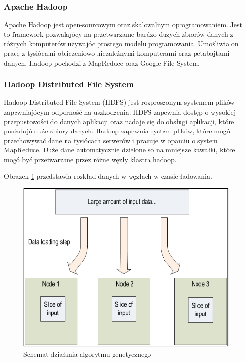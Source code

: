 \subsubsection{Apache Hadoop}
\label{ssub:apache_hadoop}
Apache Hadoop jest open-sourcowym oraz skalowalnym oprogramowaniem. Jest to framework pozwalajócy na przetwarzanie bardzo dużych zbiorów danych z różnych komputerów używajóc prostego modelu programowania. Umożliwia on pracę z tysiócami obliczeniowo niezależnymi komputerami oraz petabajtami danych. Hadoop pochodzi z MapReduce oraz Google File System.

\subsubsection{Hadoop Distributed File System}
\label{ssub:hdfs}
Hadoop Distributed File System (HDFS) jest rozproszonym systemem plików zapewniajócym odporność na uszkodzenia. HDFS zapewnia dostęp o wysokiej przepustowości do danych aplikacji oraz nadaje się do obsługi aplikacji, które posiadajó duże zbiory danych. Hadoop zapewnia system plików, które mogó przechowywać dane na tysiócach serwerów i pracuje w oparciu o system MapReduce. Duże dane automatycznie dzielone só na mniejsze kawałki, które mogó być przetwarzane przez różne węzły klastra hadoop.

Obrazek \ref{fig:rozklad_danych} przedstawia rozkład danych w węzłach w czasie ładowania.

\begin{figure}[h]
    \centerline{\includegraphics[scale=0.5]{obrazki/rozklad_danych.png}}
    \caption{Schemat działania algorytmu genetycznego}
    \label{fig:rozklad_danych}
\end{figure}

